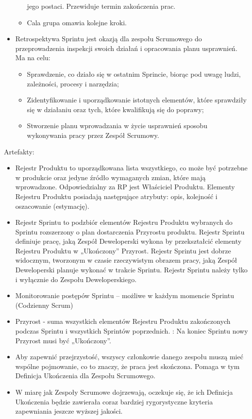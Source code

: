 \documentclass[a4paper]{article}
\begin{document}
\begin{itemize}
\begin{itemize}
jego postaci. Przewiduje termin zakończenia prac.
        \item Cala grupa omawia kolejne kroki.
    \end{itemize}
    \item Retrospektywa Sprintu jest okazją dla zespołu
Scrumowego do przeprowadzenia inspekcji
swoich działań i opracowania planu usprawnień.
Ma na celu:
    \begin{itemize}
        \item Sprawdzenie, co działo się w ostatnim Sprincie, biorąc pod
uwagę ludzi, zależności, procesy i narzędzia;
        \item Zidentyfikowanie i uporządkowanie istotnych elementów, które
sprawdziły się w działaniu oraz tych, które kwalifikują się do
poprawy;
        \item Stworzenie planu wprowadzania w życie usprawnień sposobu
wykonywania pracy przez Zespół Scrumowy.
    \end{itemize}
\end{itemize}

Artefakty:
\begin{itemize}
    \item Rejestr Produktu to uporządkowana lista wszystkiego,
co może być potrzebne w produkcie oraz jedyne
źródło wymaganych zmian, które mają
wprowadzone.
Odpowiedzialny za RP jest Właściciel Produktu.
Elementy Rejestru Produktu posiadają następujące
atrybuty: opis, kolejność i oszacowanie (estymację).
    \item Rejestr Sprintu to podzbiór elementów Rejestru
Produktu wybranych do Sprintu rozszerzony o plan
dostarczenia Przyrostu produktu.
Rejestr Sprintu definiuje pracę, jaką Zespół
Deweloperski wykona by przekształcić elementy
Rejestru Produktu w „Ukończony” Przyrost.
Rejestr Sprintu jest dobrze widocznym, tworzonym w
czasie rzeczywistym obrazem pracy, jaką Zespół
Deweloperski planuje wykonać w trakcie Sprintu.
Rejestr Sprintu należy tylko i wyłącznie do Zespołu
Deweloperskiego.
    \\
    \item Monitorowanie postępów Sprintu – możliwe w
    każdym momencie Sprintu (Codzienny Scrum)
    \item Przyrost - suma wszystkich elementów Rejestru
    Produktu zakończonych podczas Sprintu i
    wszystkich Sprintów poprzednich. :
    Na koniec Sprintu nowy Przyrost musi być
    „Ukończony”.
    \item Aby zapewnić przejrzystość, wszyscy członkowie
danego zespołu muszą mieć wspólne
pojmowanie, co to znaczy, że praca jest
skończona. Pomaga w tym Definicja Ukończenia
dla Zespołu Scrumowego.
    \item W miarę jak Zespoły Scrumowe dojrzewają,
oczekuje się, że ich Definicja Ukończenia będzie
zawierała coraz bardziej rygorystyczne kryteria
zapewniania jeszcze wyższej jakości.
\end{itemize}
\end{document}
